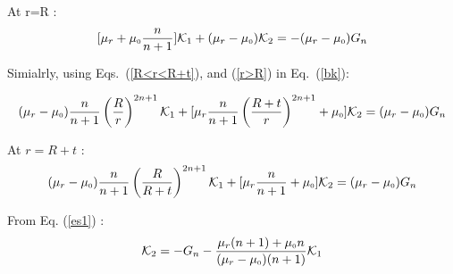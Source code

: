 At r=R :
\begin{equation}\label{es1}
[\mu_r+\mu_{\scriptscriptstyle 0}\frac{n}{n+1}]\mathcal{K}_1 +(\mu_r-\mu_{\scriptscriptstyle 0})\mathcal{K}_2=-(\mu_r-\mu_{\scriptscriptstyle 0})G_n
\end{equation}

Simialrly, using Eqs.~(\ref{R<r<R+t}), and (\ref{r>R}) in Eq.~(\ref{bk}):


$$(\mu_r-\mu_{\scriptscriptstyle 0})\frac{n}{n+1}\left(\dfrac{R}{r}\right)^{2n+1}\mathcal{K}_1+[\mu_r\frac{n}{n+1}\left(\dfrac{R+t}{r}\right)^{2n+1}+\mu_{\scriptscriptstyle 0}]\mathcal{K}_2=(\mu_r-\mu_{\scriptscriptstyle 0})G_n$$

At $r=R+t$ :
\begin{equation}\label{es2}
(\mu_r-\mu_{\scriptscriptstyle 0})\frac{n}{n+1}\left(\dfrac{R}{R+t}\right)^{2n+1}\mathcal{K}_1+[\mu_r\frac{n}{n+1}+\mu_{\scriptscriptstyle 0}]\mathcal{K}_2=(\mu_r-\mu_{\scriptscriptstyle 0})G_n
\end{equation}

From Eq. (\ref{es1}) :
\begin{equation}\label{k2}
\mathcal{K}_2=-G_n-\frac{\mu_r(n+1)+\mu_{\scriptscriptstyle 0} n}{(\mu_r-\mu_{\scriptscriptstyle 0})(n+1)}\mathcal{K}_1
\end{equation}

